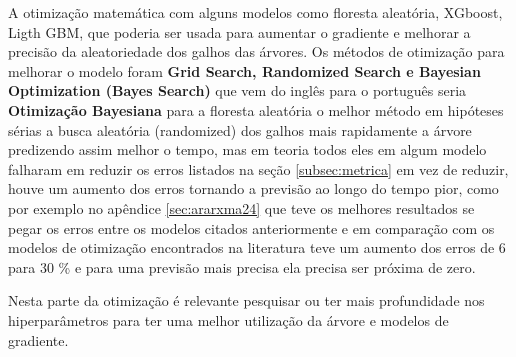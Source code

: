 A otimização matemática com alguns modelos como floresta aleatória, XGboost, Ligth GBM, que poderia ser usada para aumentar o gradiente e melhorar a precisão da aleatoriedade dos galhos das árvores. Os métodos de otimização para melhorar o modelo foram \textbf{Grid Search, Randomized Search e Bayesian Optimization (Bayes Search)} que vem do inglês para o português seria \textbf{Otimização Bayesiana} para a floresta aleatória o melhor método em hipóteses sérias a busca aleatória (randomized) dos galhos mais rapidamente a árvore predizendo assim melhor o tempo, mas em teoria todos eles em algum modelo falharam em reduzir os erros listados na seção \ref{subsec:metrica} em vez de reduzir, houve um aumento dos erros tornando a previsão ao longo do tempo pior, como por exemplo no apêndice \ref{sec:ararxma24} que teve os melhores resultados se pegar os erros entre os modelos citados anteriormente e em comparação com os modelos de otimização encontrados na literatura teve um aumento dos erros de 6 para 30 \% e para uma previsão mais precisa ela precisa ser próxima de zero.

Nesta parte da otimização é relevante pesquisar ou ter mais profundidade nos hiperparâmetros para ter uma melhor utilização da árvore e modelos de gradiente. 
